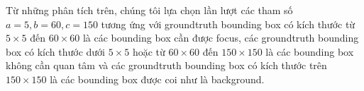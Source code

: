 {    \noindent
    Từ những phân tích trên, chúng tôi lựa chọn lần lượt các tham số $a = 5, b = 60, c = 150$ tương ứng với groundtruth bounding box có kích thước từ $5 \times 5$ đến $60 \times 60$ là các bounding box cần được focus, các groundtruth bounding box có kích thước dưới $5 \times 5$ hoặc từ $60 \times 60$ đến $150 \times 150$ là các bounding box không cần quan tâm và các groundtruth bounding box có kích thước trên $150 \times 150$ là các bounding box được coi như là background.
}